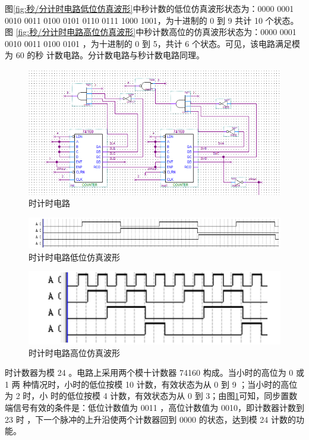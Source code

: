 \documentclass[twoside, openright]{article}
\begin{document}
图\ref{fig:秒/分计时电路低位仿真波形}中秒计数的低位仿真波形状态为：0000 0001
0010 0011 0100 0101 0110 0111 1000 1001，为十进制的 0 到 9 共计 10 个状态。图
\ref{fig:秒/分计时电路高位仿真波形}中秒计数高位的仿真波形状态为：0000 0001 0010
0011 0100 0101 ，为十进制的 0 到 5，共计 6 个状态。可见，该电路满足模为 60 的秒
计数电路。分计数电路与秒计数电路同理。

\begin{figure}[htbp]
	\centering
	\includegraphics[width = 0.8\linewidth]{min.png}
	\caption{时计时电路}
	\label{fig:时计时电路}
\end{figure}

\begin{figure}[htbp]
	\centering
	\includegraphics[width = 0.8\linewidth]{min-1.png}
	\caption{时计时电路低位仿真波形}
	\label{fig:时计时电路低位仿真波形}
\end{figure}

\begin{figure}[htbp]
	\centering
	\includegraphics[width = 0.8\linewidth]{min-2.png}
	\caption{时计时电路高位仿真波形}
	\label{fig:时计时电路高位仿真波形}
\end{figure}

时计数器为模 24 。电路上采用两个模十计数器 74160 构成。当小时的高位为 0 或 1 两
种情况时，小时的低位按模 10 计数，有效状态为从 0 到 9 ；当小时的高位为 2 时，小
时的低位按模 4 计数，有效状态为从 0 到 3；由图\ref{fig:时计时电路}可知，同步置数
端信号有效的条件是：低位计数值为 0011 ，高位计数值为 0010，即计数器计数到 23 时
，下一个脉冲的上升沿使两个计数器回到 0000 的状态，达到模 24 计数的功能。
\end{document}
